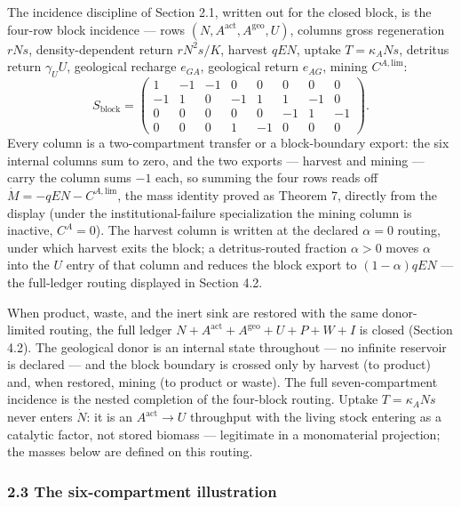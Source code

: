 \documentclass[11pt]{article}
\begin{document}
The incidence discipline of Section 2.1, written out for the closed
block, is the four-row block incidence --- rows
\((N, A^{\mathrm{act}}, A^{\mathrm{geo}}, U)\), columns gross
regeneration \(rNs\), density-dependent return \(rN^2 s/\allowbreak{}K\), harvest
\(qEN\), uptake \(T = \kappa_A N s\), detritus return \(\gamma_U U\),
geological recharge \(e_{GA}\), geological return \(e_{AG}\), mining
\(C^{A,\mathrm{lim}}\): \[S_{\mathrm{block}} =
\begin{pmatrix}
1 & -1 & -1 & 0 & 0 & 0 & 0 & 0 \\
-1 & 1 & 0 & -1 & 1 & 1 & -1 & 0 \\
0 & 0 & 0 & 0 & 0 & -1 & 1 & -1 \\
0 & 0 & 0 & 1 & -1 & 0 & 0 & 0
\end{pmatrix}.\] Every column is a two-compartment transfer or a
block-boundary export: the six internal columns sum to zero, and the two
exports --- harvest and mining --- carry the column sums \(-1\) each, so
summing the four rows reads off \(\dot M = -qEN - C^{A,\mathrm{lim}}\),
the mass identity proved as Theorem 7, directly from the display (under
the institutional-failure specialization the mining column is inactive,
\(C^A = 0\)). The harvest column is written at the declared
\(\alpha = 0\) routing, under which harvest exits the block; a
detritus-routed fraction \(\alpha > 0\) moves \(\alpha\) into the \(U\)
entry of that column and reduces the block export to \((1-\alpha)qEN\)
--- the full-ledger routing displayed in Section 4.2.

When product, waste, and the inert sink are restored with the same
donor-limited routing, the full ledger
\(N + A^{\mathrm{act}} + A^{\mathrm{geo}} + U + P + W + I\) is closed
(Section 4.2). The geological donor is an internal state throughout ---
no infinite reservoir is declared --- and the block boundary is crossed
only by harvest (to product) and, when restored, mining (to product or
waste). The full seven-compartment incidence is the nested completion of
the four-block routing. Uptake \(T = \kappa_A N s\) never enters
\(\dot N\): it is an \(A^{\mathrm{act}} \to U\) throughput with the
living stock entering as a catalytic factor, not stored biomass ---
legitimate in a monomaterial projection; the masses below are defined on
this routing.

\subsubsection{2.3 The six-compartment
illustration}\label{the-six-compartment-illustration}
\end{document}
